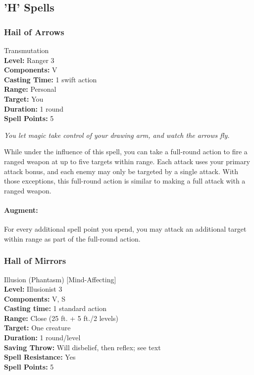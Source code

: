 \subsection{'H' Spells}
\subsubsection{Hail of Arrows}
\label{Spell:HailOfArrows}
Transmutation
\\ \textbf{Level:} Ranger 3
\\ \textbf{Components:} V
\\ \textbf{Casting Time:} 1 swift action
\\ \textbf{Range:} Personal
\\ \textbf{Target:} You
\\ \textbf{Duration:} 1 round
\\ \textbf{Spell Points:} 5

\emph{You let magic take control of your drawing arm, and watch the arrows fly.}

While under the influence of this spell, you can take a full-round action to fire a ranged weapon at up to five targets within range.
Each attack uses your primary attack bonus, and each enemy may only be targeted by a single attack.
With those exceptions, this full-round action is similar to making a full attack with a ranged weapon.

\paragraph{Augment:} For every additional spell point you spend, you may attack an additional target within range as part of the full-round action.
\subsubsection{Hall of Mirrors}
\label{Spell:HallOfMirrors}
Illusion (Phantasm) [Mind-Affecting]
\\ \textbf{Level:} Illusionist 3
\\ \textbf{Components:} V, S
\\ \textbf{Casting time:} 1 standard action
\\ \textbf{Range:} Close (25 ft. + 5 ft./2 levels)
\\ \textbf{Target:} One creature
\\ \textbf{Duration:} 1 round/level
\\ \textbf{Saving Throw:} Will disbelief, then reflex; see text
\\ \textbf{Spell Resistance:} Yes
\\ \textbf{Spell Points:} 5

